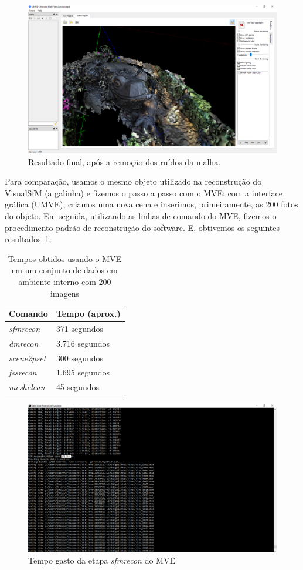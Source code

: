 \begin{figure}[!h]
	\centering
	\includegraphics[width=1\linewidth]{figs/mvemeshclean.png}
	\caption{%
	Resultado final, após a remoção dos ruídos da malha.
	}\label{fig:MVEMeshClean}
\end{figure} 

Para comparação, usamos o mesmo objeto utilizado na reconstrução do VisualSfM (a galinha) e fizemos o passo a passo com o MVE: com a interface gráfica (UMVE), criamos uma nova cena e inserimos, primeiramente, as 200 fotos do objeto. Em seguida, utilizando as linhas de comando do MVE, fizemos o procedimento padrão de reconstrução do software. E, obtivemos os seguintes resultados~\ref{tab:galinha200mve}:

\begin{table}[!h]
\centering
\caption{Tempos obtidos usando o MVE em um conjunto de dados em ambiente interno com 200 imagens}
\label{tab:galinha200mve}
\begin{tabular}{|l|l|}
\hline
Comando            & Tempo (aprox.)         \\ \hline
\emph{sfmrecon}  & 371 segundos   \\ \hline
\emph{dmrecon}   & 3.716 segundos \\ \hline
\emph{scene2pset} & 300 segundos   \\ \hline
\emph{fssrecon}  & 1.695 segundos \\ \hline
\emph{meshclean} & 45 segundos    \\ \hline
\end{tabular}
\end{table}

\newpage

\begin{figure}[!h]
	\centering
	\includegraphics[width=0.5\linewidth]{figs/galinhalongesfmreconmve.png}
	\caption{%
	Tempo gasto da etapa \emph{sfmrecon} do MVE
	}\label{fig:sfmrecon1}
\end{figure}


